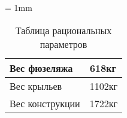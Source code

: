 

\tabulinesep = 1mm
\begin{table}[H]
\captionsetup{justification=centering}
\caption{Таблица рациональных параметров}
\begin{tabu}to 
\hline
Вес фюзеляжа & 618кг \\ \hline
Вес крыльев & 1102кг \\ \hline
Вес конструкции & 1722кг \\ \hline
\end{tabu}
\end{table}
